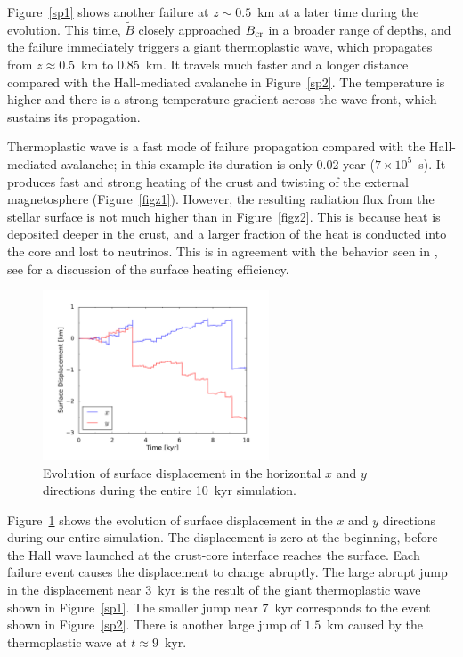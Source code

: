 Figure~\ref{sp1} shows another failure at $z\sim 0.5$~km at a later time during the evolution. 
This time, $\tilde{B}$ closely approached $B_{\rm cr}$ in a broader range of depths, and the failure immediately triggers a giant thermoplastic wave, which propagates from $z\approx 0.5$~km to 0.85~km. 
It travels much faster and a longer distance compared with the Hall-mediated avalanche in Figure~\ref{sp2}. 
The temperature is higher and there is a strong temperature gradient across the wave front, which sustains its propagation.

Thermoplastic wave is a fast mode of failure propagation compared with the Hall-mediated avalanche; in this example its duration is only 0.02 year ($7\times 10^5$~s). 
It produces fast and strong heating of the crust and twisting of the external magnetosphere (Figure~\ref{figz1}). 
However, the resulting radiation flux from the stellar surface is not much higher than in Figure~\ref{figz2}.
This is because heat is deposited deeper in the crust, and a larger fraction of the heat is conducted into the core and lost to neutrinos.
This is in agreement with the behavior seen in \citet{2006MNRAS.371..477K,2014MNRAS.442.3484K}, see \citet{2016ApJ...833..261B} for a discussion of the surface heating efficiency.

\begin{figure}[h]
\centering
\includegraphics[width=0.6\textwidth]{pics/chap2/dis.pdf} 
\caption[Evolution of surface displacement]{Evolution of surface displacement in the horizontal $x$ and $y$ directions during the entire 10~kyr simulation.}
\label{dis}
\end{figure}

Figure~\ref{dis} shows the evolution of surface displacement in the $x$ and $y$ directions during our entire simulation. 
The displacement is zero at the beginning, before the Hall wave launched at the crust-core interface reaches the surface. 
Each failure event causes the displacement to change abruptly. The large abrupt jump in the displacement near $3$~kyr is the result of the giant thermoplastic wave shown in Figure~\ref{sp1}. 
The smaller jump near $7$~kyr corresponds to the event shown in Figure~\ref{sp2}. 
There is another large jump of $1.5$~km caused by the thermoplastic wave at $t\approx 9$~kyr.

